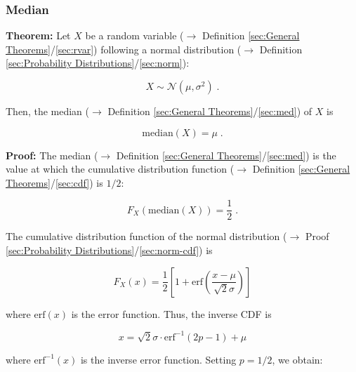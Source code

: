 \documentclass[a4paper,12pt,twoside]{book}
\begin{document}
\subsubsection[\textbf{Median}]{Median} \label{sec:norm-med}
\setcounter{equation}{0}

\textbf{Theorem:} Let $X$ be a random variable ($\rightarrow$ Definition \ref{sec:General Theorems}/\ref{sec:rvar}) following a normal distribution ($\rightarrow$ Definition \ref{sec:Probability Distributions}/\ref{sec:norm}):

\begin{equation} \label{eq:norm-med-norm}
X \sim \mathcal{N}(\mu, \sigma^2) \; .
\end{equation}

Then, the median ($\rightarrow$ Definition \ref{sec:General Theorems}/\ref{sec:med}) of $X$ is

\begin{equation} \label{eq:norm-med-norm-median}
\mathrm{median}(X) = \mu \; .
\end{equation}


\vspace{1em}
\textbf{Proof:} The median ($\rightarrow$ Definition \ref{sec:General Theorems}/\ref{sec:med}) is the value at which the cumulative distribution function ($\rightarrow$ Definition \ref{sec:General Theorems}/\ref{sec:cdf}) is $1/2$:

\begin{equation} \label{eq:norm-med-median}
F_X(\mathrm{median}(X)) = \frac{1}{2} \; .
\end{equation}

The cumulative distribution function of the normal distribution ($\rightarrow$ Proof \ref{sec:Probability Distributions}/\ref{sec:norm-cdf}) is

\begin{equation} \label{eq:norm-med-norm-cdf}
F_X(x) = \frac{1}{2} \left[ 1 + \mathrm{erf} \left( \frac{x-\mu}{\sqrt{2}\sigma} \right) \right]
\end{equation}

where $\mathrm{erf}(x)$ is the error function. Thus, the inverse CDF is

\begin{equation} \label{eq:norm-med-norm-cdf-inv}
x = \sqrt{2}\sigma \cdot \mathrm{erf}^{-1}(2p-1) + \mu
\end{equation}

where $\mathrm{erf}^{-1}(x)$ is the inverse error function. Setting $p = 1/2$, we obtain:
\end{document}
